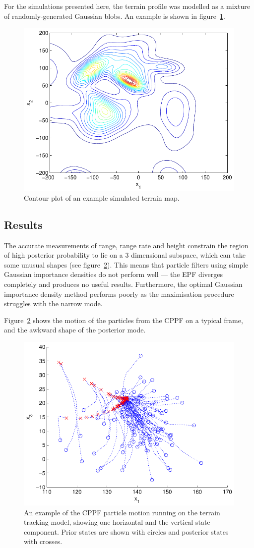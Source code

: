 \documentclass[conference]{IEEEtran}
\begin{document}
For the simulations presented here, the terrain profile was modelled as a mixture of randomly-generated Gaussian blobs. An example is shown in figure~\ref{fig:drone_terrain_map}.
%
\begin{figure}
\centering
\includegraphics[width=0.7\columnwidth]{drone_terrain_map.pdf}
\caption{Contour plot of an example simulated terrain map.}
\label{fig:drone_terrain_map}
\end{figure}

\subsection{Results}

The accurate measurements of range, range rate and height constrain the region of high posterior probability to lie on a $3$ dimensional subspace, which can take some unusual shapes (see figure~\ref{fig:drone_example_frame}). This means that particle filters using simple Gaussian importance densities do not perform well --- the EPF diverges completely and produces no useful results. Furthermore, the optimal Gaussian importance density method performs poorly as the maximisation procedure struggles with the narrow mode.

Figure~\ref{fig:drone_example_frame} shows the motion of the particles from the CPPF on a typical frame, and the awkward shape of the posterior mode.
%
\begin{figure}
\centering
\includegraphics[width=0.7\columnwidth]{drone_example_frame_deter.pdf}
\caption{An example of the CPPF particle motion running on the terrain tracking model, showing one horizontal and the vertical state component. Prior states are shown with circles and posterior states with crosses.}
\label{fig:drone_example_frame}
\end{figure}
\end{document}
